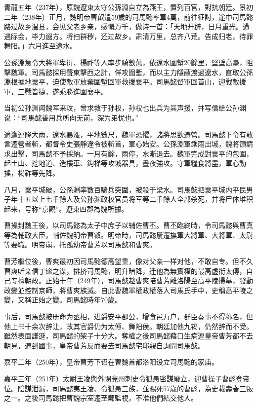 青龍五年（237年），原魏遼東太守公孫淵自立為燕王，置列百官，對抗朝廷。景初二年（238年）正月，魏明帝曹叡遣59歲的司馬懿率軍4萬，前往征討，途中司馬懿路过故乡温县，会见父老乡亲，感慨万千，做诗一首：「天地开辟，日月重光。遭遇际会，毕力遐方。将扫群秽，还过故乡。肃清万里，总齐八荒。告成归老，待罪舞阳。」六月進至遼水。

公孫淵急令大將軍卑衍、楊祚等人率步騎數萬，依遼水圍塹20餘里，堅壁高壘，阻擊魏軍。司馬懿採用聲東擊西之計，佯攻圍塹，而以主力隱蔽渡過遼水，直取公孫淵根據地襄平，迫使敵軍放棄圍塹回軍救援襄平。司馬懿督軍回首山，迎戰敵援軍，三戰皆捷，遂乘勝進圍襄平。

当初公孙渊闻魏军来攻，曾求救于孙权，孙权也出兵为其声援，并写信给公孙渊说：“司馬懿善用兵所向无前，深为弟忧也。”

適逢連降大雨，遼水暴漲，平地數尺，魏軍恐懼，諸將思欲遷營。司馬懿下令有敢言遷營者斬，都督令史張靜違令被斬首，軍心始安。公孫淵軍乘雨出城，魏將領請求出擊，司馬懿不予採納。一月有餘，雨停，水漸退去。魏軍完成對襄平的包圍，起土山、挖地道、造樓車、鉤梯等攻城器具，晝夜強攻。守軍糧食將盡，軍心動搖，楊祚等先降。

八月，襄平城破，公孫淵率數百騎兵突圍，被殺于梁水。司馬懿把襄平城内平民男子年十五以上七千餘人及公孙渊政权官员将军等二千餘人全部杀死，并将尸体堆积起来，号称“京觀”。遼東四郡為魏所據。

曹操封魏王後，以司馬懿為太子中庶子以辅佐曹丕。曹丕臨終時，令司馬懿與曹真等為輔政大臣，輔佐魏明帝曹叡。明帝時，司馬懿屢遷撫軍大將軍、大將軍、太尉等要職。明帝崩，托孤幼帝曹芳以司馬懿和曹爽。

曹芳繼位後，曹爽最初因司馬懿德高望重，像对父亲一样对他，不敢自专。但不久曹爽听亲信丁谧之谋，排挤司馬懿，明升暗降，迁他為無實權的最高虚衔太傅，自己专擅朝政。正始十年（249年），司馬懿趁曹爽陪曹芳離洛陽至高平陵掃墓，發動政變並控制京師，將曹爽族滅。自此曹魏軍權政權落入司馬氏手中，史稱高平陵之變，又稱正始之變。司馬懿時年70歲。

事后，司馬懿被册命为丞相，进爵安平郡公，增食邑万户，群臣奏事不得称名，但他上书十余次辞让，故其官爵仍为太傅、舞阳侯。朝廷加他九锡，仍然辞而不受。雖然表面謙遜，司馬懿的架子十分大。奪權之後司馬懿藉口生病連皇帝曹芳都不去朝見，遇到國事，皇帝曹芳反而要去司馬懿宅邸親自詢問司馬懿。

嘉平二年（250年），皇帝曹芳下诏在曹魏首都洛阳设立司馬懿的家庙。

嘉平三年（251年）太尉王凌與外甥兗州刺史令狐愚密謀廢立，迎曹操子曹彪登帝位。陰謀泄漏，司馬懿夷王凌、令狐愚三族，並賜死57歲的曹彪，為史載壽春三叛之一。之後司馬懿把曹魏宗室遷至鄴監視，不准他們結交他人。

